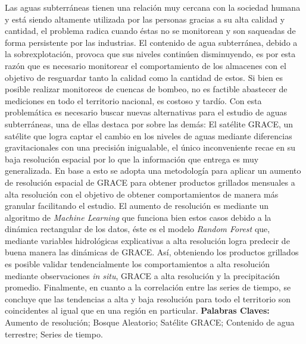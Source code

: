 Las aguas subterráneas tienen una relación muy cercana con la sociedad humana y está siendo altamente utilizada por las personas gracias a su
alta calidad y cantidad, el problema radica cuando éstas no se monitorean y son saqueadas de forma persistente por las industrias. El contenido de agua
subterránea, debido a la sobrexplotación, provoca que sus niveles continúen disminuyendo, es por esta razón que es necesario monitorear el comportamiento de 
los almacenes con el objetivo de resguardar tanto la calidad como la cantidad de estos. Si bien es posible realizar monitoreos de cuencas de bombeo, no es 
factible abastecer de mediciones en todo el territorio nacional, es costoso y tardío. Con esta problemática es necesario buscar nuevas alternativas para el estudio de 
aguas subterráneas, una de ellas destaca por sobre las demás: El satélite GRACE, un satélite que logra captar el cambio en los niveles de aguas mediante diferencias gravitacionales con una precisión inigualable,
el único inconveniente recae en su baja resolución espacial por lo que la información que entrega es muy
generalizada. En base a esto se adopta una metodología para aplicar un aumento de resolución espacial de GRACE para obtener productos grillados mensuales a alta resolución con el 
objetivo de obtener comportamientos de manera más granular facilitando el estudio. El aumento de resolución es mediante un algoritmo de \textit{Machine Learning} que funciona bien estos casos 
debido a la dinámica rectangular de los datos, éste es el modelo \textit{Random Forest} que, mediante variables hidrológicas explicativas a alta resolución logra predecir de buena manera 
las dinámicas de GRACE. Así, obteniendo los productos grillados es posible validar tendencialmente
los comportamientos a alta resolución mediante observaciones \textit{in situ}, GRACE a alta resolución y la precipitación promedio.
Finalmente, en cuanto a la correlación entre las series de tiempo, se concluye que las tendencias a alta y baja resolución para todo el territorio son coincidentes al igual que en una región en particular.
\vskip 0.2in
\noindent
{\bf Palabras Claves:} Aumento de resolución; Bosque Aleatorio; Satélite GRACE; Contenido de agua terrestre; Series de tiempo.
